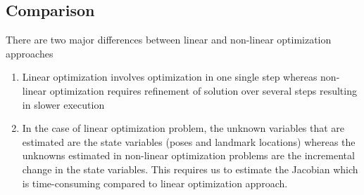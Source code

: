 \documentclass[12pt, a4paper]{article}
\begin{document}
\subsection{Comparison}
There are two major differences between linear and non-linear optimization approaches
\begin{enumerate}
  \item Linear optimization involves optimization in one single step whereas non-linear optimization requires refinement of solution over several steps resulting in slower execution
  \item In the case of linear optimization problem, the unknown variables that are estimated are the state variables (poses and landmark locations) whereas the unknowns estimated in non-linear optimization problems are the incremental change in the state variables. This requires us to estimate the Jacobian which is time-consuming compared to linear optimization approach.
\end{enumerate}
\end{document}
